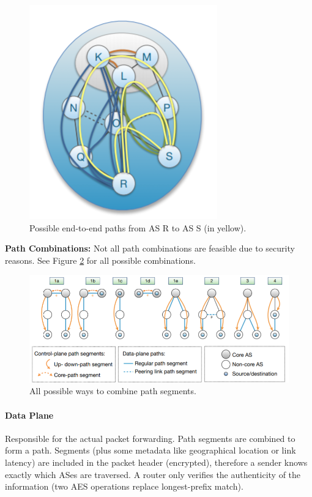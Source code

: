 \begin{figure}[h]
	\centering
	\includegraphics[scale=0.7]{images/910-path.PNG}
	\caption{Possible end-to-end paths from AS R to AS S (in yellow).}
	\label{fig:paths}
\end{figure}

\textbf{Path Combinations:} Not all path combinations are feasible due to security reasons. See Figure \ref{fig:combis} for all possible combinations.

\begin{figure}[h]
	\centering
	\includegraphics[scale=0.8]{images/910-combis.PNG}
	\caption{All possible ways to combine path segments.}
	\label{fig:combis}
\end{figure}

\paragraph{Data Plane}
Responsible for the actual packet forwarding. Path segments are combined to form a path. Segments (plus some metadata like geographical location or link latency) are included in the packet header (encrypted), therefore a sender knows exactly which ASes are traversed. A router only verifies the authenticity of the information (two AES operations replace longest-prefix match).


